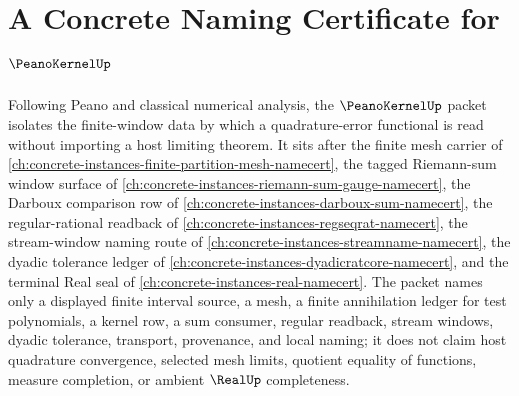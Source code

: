 \chapter{A Concrete Naming Certificate for $\PeanoKernelUp$}
\label{ch:concrete-instances-peano-kernel-namecert}

Following Peano and classical numerical analysis, the $\PeanoKernelUp$ packet isolates the finite-window data by which a quadrature-error functional is read without importing a host limiting theorem. It sits after the finite mesh carrier of \autoref{ch:concrete-instances-finite-partition-mesh-namecert}, the tagged Riemann-sum window surface of \autoref{ch:concrete-instances-riemann-sum-gauge-namecert}, the Darboux comparison row of \autoref{ch:concrete-instances-darboux-sum-namecert}, the regular-rational readback of \autoref{ch:concrete-instances-regseqrat-namecert}, the stream-window naming route of \autoref{ch:concrete-instances-streamname-namecert}, the dyadic tolerance ledger of \autoref{ch:concrete-instances-dyadicratcore-namecert}, and the terminal Real seal of \autoref{ch:concrete-instances-real-namecert}. The packet names only a displayed finite interval source, a mesh, a finite annihilation ledger for test polynomials, a kernel row, a sum consumer, regular readback, stream windows, dyadic tolerance, transport, provenance, and local naming; it does not claim host quadrature convergence, selected mesh limits, quotient equality of functions, measure completion, or ambient $\RealUp$ completeness.

